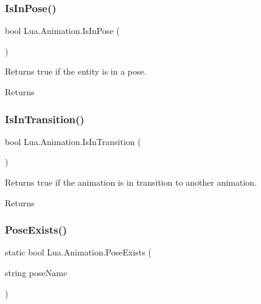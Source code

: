 \subsubsection{\texorpdfstring{IsInPose()}{IsInPose()}}
{\footnotesize\ttfamily bool Lua.\+Animation.\+Is\+In\+Pose (\begin{DoxyParamCaption}{ }\end{DoxyParamCaption})}



Returns true if the entity is in a pose. 

\begin{DoxyReturn}{Returns}

\end{DoxyReturn}
\mbox{\label{class_lua_1_1_animation_a6f6e8dabc438a05a0338f69a25a61d71}} 
\subsubsection{\texorpdfstring{IsInTransition()}{IsInTransition()}}
{\footnotesize\ttfamily bool Lua.\+Animation.\+Is\+In\+Transition (\begin{DoxyParamCaption}{ }\end{DoxyParamCaption})}



Returns true if the animation is in transition to another animation. 

\begin{DoxyReturn}{Returns}

\end{DoxyReturn}
\mbox{\label{class_lua_1_1_animation_a7826d8216e7d202f625e697341ae62fc}} 
\subsubsection{\texorpdfstring{PoseExists()}{PoseExists()}}
{\footnotesize\ttfamily static bool Lua.\+Animation.\+Pose\+Exists (\begin{DoxyParamCaption}\item[{string}]{pose\+Name }\end{DoxyParamCaption})\hspace{0.3cm}{\ttfamily [static]}}



